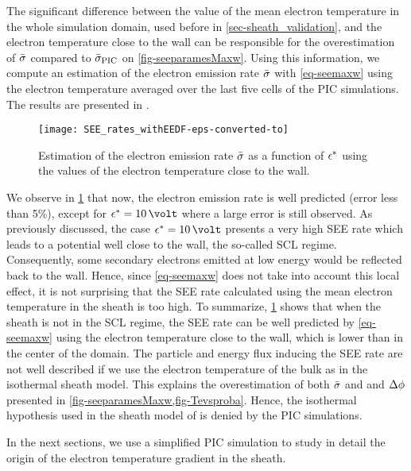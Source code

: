    The significant difference between the value of the mean electron temperature in the whole simulation domain, used before in \cref{sec-sheath_validation}, and the electron temperature close to the wall can be responsible for the overestimation of $ \bar{\sigma }$ compared to $ \bar{\sigma }_{\rm PIC}$ on \cref{fig-seeparamesMaxw}.
   Using this information, we compute an estimation of the electron emission rate $ \bar{\sigma }$ with \cref{eq-seemaxw} using the electron temperature averaged over the last five cells of the PIC simulations.
   The results are presented in .
   
   \begin{figure}[!hbt]
     \centering
     \texttt{[image: SEE\_rates\_withEEDF-eps-converted-to]}
     \caption{Estimation of the electron emission rate $ \bar{\sigma }$ as a function of $\epsilon^{*}$ using the values of the electron temperature close to the wall.}
     \label{fig-rate_pic_wall}
   \end{figure}
   
   We observe in \cref{fig-rate_pic_wall} that now, the electron emission rate is well predicted (error less than 5\%), except for $\crover=10\,\volt$ where a large error is still observed.
   As previously discussed, the case $\crover=10\,\volt$ presents a very high SEE rate which leads to a potential well close to the wall, the so-called \ac{SCL} regime.
   Consequently, some secondary electrons emitted at low energy would be reflected back to the wall.
   Hence, since \cref{eq-seemaxw} does not take into account this local effect, it is not surprising that the SEE rate calculated using the mean electron temperature in the sheath is too high.
   To summarize, \cref{fig-rate_pic_wall} shows that when the sheath  is not in the \ac{SCL} regime, the \ac{SEE} rate can be well predicted by \cref{eq-seemaxw} using the electron temperature close to the wall, which is lower than in the center of the domain.
   The particle and energy flux inducing the \ac{SEE} rate are not well described if we use the electron temperature of the bulk as in the isothermal sheath model.
   This explains the overestimation of both $ \bar{\sigma }$ and and $\Delta \phi$ presented in \cref{fig-seeparamesMaxw,fig-Tevsproba}.
   Hence, the isothermal hypothesis used in the sheath model of  is denied by the PIC simulations.
   
   In the next sections, we use a simplified \ac{PIC} simulation to study in detail the origin of the electron temperature gradient in the sheath.
   


